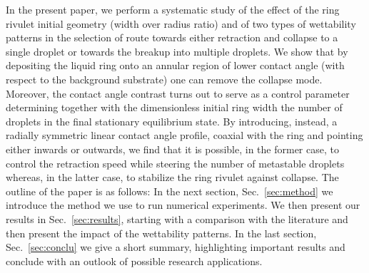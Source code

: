\documentclass[twoside,twocolumn,9pt]{article}
\begin{document}
In the present paper, we perform a systematic study of the effect of the ring rivulet initial geometry (width over radius ratio) and of two types of wettability patterns in the selection of route towards either retraction and collapse to a single droplet or towards the breakup into multiple droplets. 
We show that by depositing the liquid ring onto an annular region of lower contact angle (with respect to the background substrate) one can remove the collapse mode. 
Moreover, the contact angle contrast turns out to serve as a control parameter determining together with the dimensionless initial ring width the number of droplets in the final stationary equilibrium state.
By introducing, instead, a radially symmetric linear contact angle profile, coaxial with the ring and pointing either inwards or outwards, we find that it is possible, in the former case, to control the retraction speed while steering the number of metastable droplets whereas, in the latter case, to stabilize the ring rivulet against collapse.
The outline of the paper is as follows: In the next section, Sec.~\ref{sec:method} we introduce the method we use to run numerical experiments.
We then present our results in Sec.~\ref{sec:results}, starting with a comparison with the literature and then present the impact of the wettability patterns.
In the last section, Sec.~\ref{sec:conclu} we give a short summary, highlighting important results and conclude with an outlook of possible research applications.
\end{document}
